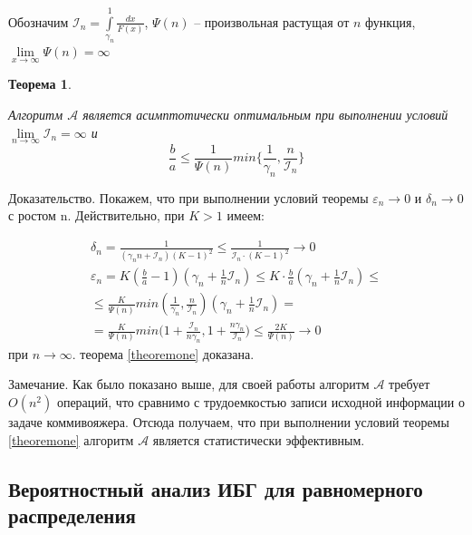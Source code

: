 \documentclass[a4paper, 14pt]{extarticle}
\numberwithin{equation}{section}
\newtheorem{theorem}{Теорема}[section]
\begin{document}
Обозначим $\mathcal{I}_n = \int\limits_{\gamma_n}^1 \frac{dx}{F(x)}$, $\Psi(n)$ -- произвольная растущая от $n$ функция, $\lim\limits_{x\to \infty} \Psi(n) = \infty $ \\

\begin{theorem}
\label{theoremone}

Алгоритм $\mathcal{A}$ является асимптотически оптимальным при выполнении условий $\lim\limits_{{n} \to \infty} \mathcal{I}_n = \infty $ и 
\begin{equation*}
\frac{b}{a} \leqslant \frac{1}{\Psi(n)} min \{ \frac{1}{\gamma_n}, \frac{n}{\mathcal{I}_n} \}
\end{equation*}

\end{theorem}

Доказательство. Покажем, что при выполнении условий теоремы $\varepsilon_n \to 0$ и $\delta_n \to 0$ с ростом n. Действительно, при $K>1$ имеем:

\begin{equation*}
\begin{aligned}
\delta_n = \frac{1}{(\gamma_n n+\mathcal{I}_n)(K-1)^2} \leqslant \frac{1}{\mathcal{I}_n \cdot (K-1)^2} \to 0 \\
\varepsilon_n = K(\frac{b}{a}-1)(\gamma_n+\frac{1}{n} \mathcal{I}_n) \leqslant K \cdot \frac{b}{a} (\gamma_n+\frac{1}{n} \mathcal{I}_n)\leqslant \\
\leqslant \frac{K}{\Psi(n)} min(\frac{1}{\gamma_n}, \frac{n}{\mathcal{I}_n})(\gamma_n+\frac{1}{n} \mathcal{I}_n) = \\
= \frac{K}{\Psi(n)} min \bigg(1+\frac{\mathcal{I}_n}{n \gamma_n}, 1+\frac{n \gamma_n}{\mathcal{I}_n} \bigg) \leqslant \frac{2K}{\Psi(n)} \to 0
\end{aligned}
\end{equation*}
при $n \to \infty$. теорема \eqref{theoremone} доказана.

Замечание. Как было показано выше, для своей работы алгоритм $\mathcal{A}$ требует $O(n^2)$ операций, что сравнимо с трудоемкостью записи исходной информации о задаче коммивояжера. Отсюда получаем, что при выполнении условий теоремы \eqref{theoremone} алгоритм $\mathcal{A}$ является статистически эффективным.\\


\subsection{Вероятностный анализ ИБГ для равномерного распределения}
\end{document}
